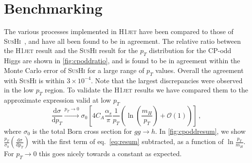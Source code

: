 \documentclass[12pt]{article}
\begin{document}
\vspace{-3mm} 

\section{Benchmarking}
\label{sec:benchmarking}
The various processes implemented in \textsc{H1jet} have been compared to those of \textsc{SusHi}~\cite{Harlander:2012pb,Harlander:2016hcx}, and have all been found to be in agreement. The relative ratio between the \textsc{H1jet} result and the
\textsc{SusHi} result for the $p_T$ distribution for the CP-odd Higgs
are shown in \autoref{fig:cpoddratio}, and is found to be in agreement
within the Monte Carlo error of \textsc{SusHi} for a large range of
$p_T$ values. Overall the agreement with \textsc{SusHi} is within
$3 \times 10^{-4}$. Note that the largest discrepancies were observed in the low $p_T$
region. To validate the \textsc{H1jet} results we have compared them
to the approximate expression valid at low $p_T$
\begin{equation}
	\frac{\mathrm{d} \sigma}{\mathrm{d} p_T} \xrightarrow{p_T \rightarrow 0} \sigma_0 \left [ 4 C_A \frac{\alpha_s}{\pi} \frac{1}{p_T} \left(\ln\left ( \frac{m_H}{p_T} \right ) + \mathcal{O} (1)\right) \right ] \,, \label{eq:resum}
\end{equation}
where $\sigma_0$ is the total Born cross section for $gg \rightarrow h$. In \autoref{fig:cpoddresum}, we show $\frac{p_T}{\sigma_0} \left ( \frac{\mathrm{d} \sigma}{\mathrm{d} p_T} \right )$ with the first term of eq.~\eqref{eq:resum} subtracted, as a function of $\ln \frac{p_T}{m_H}$. For $p_T \rightarrow 0$ this goes nicely towards a constant as expected. 

\newpage 
\end{document}

